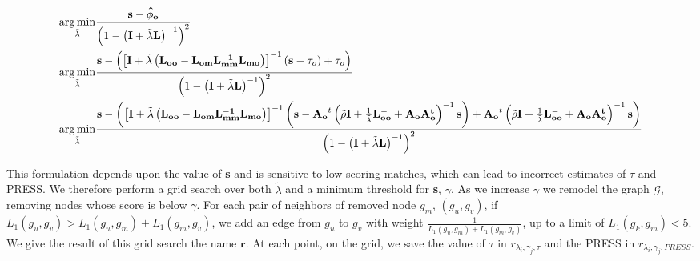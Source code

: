         \begin{align}
            \operatorname*{arg\,min}_{\tilde \lambda} & \frac{\mathbf{s - {\hat \phi_o}}}{\left(
                1 - \left(
                    \mathbf{I} + {\tilde \lambda}\mathbf{L}
                \right)^{-1}
            \right)^2}\\
            \operatorname*{arg\,min}_{\tilde \lambda} & \frac{\mathbf{s} - \left(\left[
                \mathbf{I} + {\tilde \lambda}\left(\mathbf{L_{oo}} -
                    \mathbf{L_{om}}\mathbf{L_{mm}^{-1}}\mathbf{L_{mo}}
                \right)\right]^{-1}(\mathbf{s} - \tau_o) + \tau_o\right)}{\left(
                1 - \left(
                    \mathbf{I} + {\tilde \lambda}\mathbf{L}
                \right)^{-1}
            \right)^2} \nonumber\\
            \operatorname*{arg\,min}_{\tilde \lambda} & \frac{
                \mathbf{s} - \left(\left[
                    \mathbf{I} + {\tilde \lambda}\left(\mathbf{L_{oo}} -
                        \mathbf{L_{om}}\mathbf{L_{mm}^{-1}}\mathbf{L_{mo}}
                    \right)\right]^{-1}\left(\mathbf{s} - \mathbf{A_o}^t\left(
                    {\tilde\rho}\mathbf{I} + \frac{1}{{\tilde\lambda}}\mathbf{L_{oo}^-} + 
                    \mathbf{A_oA_o^t}
                    \right)^{-1}\mathbf{s}\right) + \mathbf{A_o}^t\left(
                    {\tilde\rho}\mathbf{I} + \frac{1}{{\tilde\lambda}}\mathbf{L_{oo}^-} + 
                    \mathbf{A_oA_o^t}
                    \right)^{-1}\mathbf{s}\right)}{
                    \left(
                        1 - \left(
                            \mathbf{I} + {\tilde \lambda}\mathbf{L}
                        \right)^{-1}
                    \right)^2} \label{eqn:press_for_lambda}
        \end{align}

        This formulation depends upon the value of \textbf{s} and is
        sensitive to low scoring matches, which can lead to incorrect
        estimates of $\tau$ and PRESS. We therefore perform a grid
        search over both ${\tilde \lambda}$ and a minimum threshold
        for \textbf{s}, $\gamma$.
        As we increase $\gamma$ we remodel the graph $\mathcal{G}$,
        removing nodes whose score is below $\gamma$. For each pair
        of neighbors of removed node $g_m$, $(g_u, g_v)$, if
        $L_1(g_u, g_v) >  L_1(g_u, g_m) + L_1(g_m, g_v)$, we add an
        edge from $g_u$ to $g_v$ with weight $\frac{1}{L_1(g_u, g_m)
        + L_1(g_m, g_v)}$, up to a limit of $L_1(g_k, g_m) < 5$.
        We give the result of this grid search the name $\mathbf{r}$.
        At each point, on the grid, we save the value of $\tau$ in
        $r_{\lambda_i, \gamma_j, \tau}$ and the PRESS in $r_{
        \lambda_i, \gamma_j, PRESS}$.

